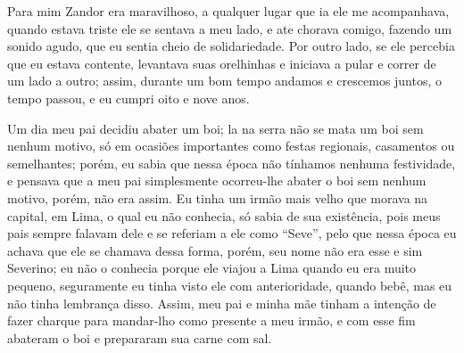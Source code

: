 Para mim Zandor era maravilhoso, a qualquer lugar que ia ele me acompanhava, quando estava triste ele se sentava a meu lado, e ate chorava comigo, fazendo um sonido agudo, que eu sentia cheio de solidariedade. 
Por outro lado, se ele percebia que eu estava contente, levantava suas orelhinhas e iniciava a pular e correr de um lado a outro; assim, durante um bom tempo andamos e crescemos juntos, o tempo passou, e eu cumpri oito e nove anos.

Um dia meu pai decidiu abater um boi; la na serra não se mata um boi sem nenhum motivo, só em ocasiões importantes como festas regionais, casamentos ou semelhantes; porém, eu sabia que nessa época não tínhamos nenhuma festividade, e pensava que a meu pai simplesmente ocorreu-lhe abater o boi sem nenhum motivo, porém, não era assim. 
Eu tinha um irmão mais velho que morava na capital, em Lima, o qual eu não conhecia, só sabia de sua existência, pois meus pais sempre falavam dele e se referiam a ele como ``Seve'', pelo que nessa época eu achava que ele se chamava dessa forma, porém, seu nome não era esse e sim Severino; eu não o conhecia porque ele viajou a Lima quando eu era muito pequeno, seguramente eu tinha visto ele com anterioridade, quando bebê, mas eu não tinha lembrança disso. 
Assim, meu pai e minha mãe tinham a intenção de fazer charque para mandar-lho como presente a meu irmão, e com esse fim abateram o boi e prepararam sua carne com sal.


